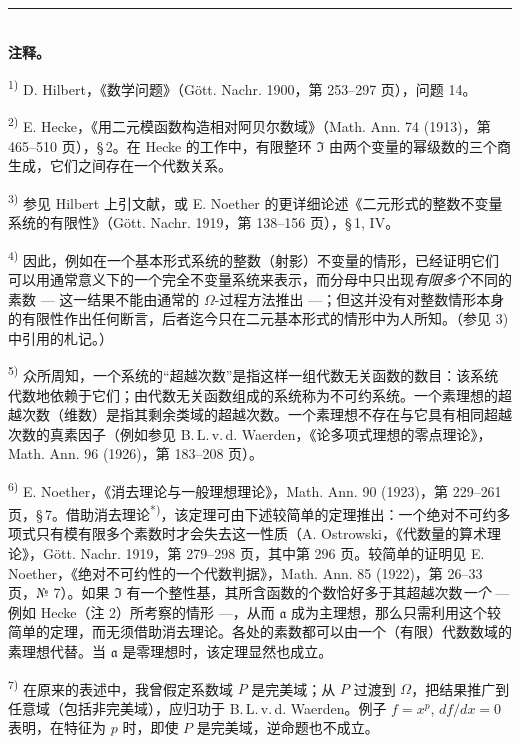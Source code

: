 \documentclass[11pt]{article}
\begin{document}
\begin{center}
\rule{4cm}{0.4pt}\\[0.6em]
\textbf{注释。}
\end{center}

{\small
\setlength{\parindent}{0pt}
\noindent\textsuperscript{1)} D. Hilbert，《数学问题》（Gött. Nachr. 1900，第 253--297 页），问题 14。

\noindent\textsuperscript{2)} E. Hecke，《用二元模函数构造相对阿贝尔数域》（Math. Ann. 74 (1913)，第 465--510 页），\S\,2。在 Hecke 的工作中，有限整环 $\mathfrak{I}$ 由两个变量的幂级数的三个商生成，它们之间存在一个代数关系。

\noindent\textsuperscript{3)} 参见 Hilbert 上引文献，或 E. Noether 的更详细论述《二元形式的整数不变量系统的有限性》（Gött. Nachr. 1919，第 138--156 页），\S\,1, IV。

\noindent\textsuperscript{4)} 因此，例如在一个基本形式系统的整数（射影）不变量的情形，已经证明它们可以用通常意义下的一个完全不变量系统来表示，而分母中只出现\emph{有限多个}不同的素数 --- 这一结果不能由通常的 $\Omega$-过程方法推出 ---；但这并没有对整数情形本身的有限性作出任何断言，后者迄今只在二元基本形式的情形中为人所知。（参见 3) 中引用的札记。）

\noindent\textsuperscript{5)} 众所周知，一个系统的“超越次数”是指这样一组代数无关函数的数目：该系统代数地依赖于它们；由代数无关函数组成的系统称为不可约系统。一个素理想的超越次数（维数）是指其剩余类域的超越次数。一个素理想不存在与它具有相同超越次数的真素因子（例如参见 B.\,L.\,v.\,d. Waerden，《论多项式理想的零点理论》，Math. Ann. 96 (1926)，第 183--208 页）。

\noindent\textsuperscript{6)} E. Noether，《消去理论与一般理想理论》，Math. Ann. 90 (1923)，第 229--261 页，\S\,7。借助消去理论\textsuperscript{*)}，该定理可由下述较简单的定理推出：一个绝对不可约多项式只有模有限多个素数时才会失去这一性质（A. Ostrowski，《代数量的算术理论》，Gött. Nachr. 1919，第 279--298 页，其中第 296 页。较简单的证明见 E. Noether，《绝对不可约性的一个代数判据》，Math. Ann. 85 (1922)，第 26--33 页，№ 7）。如果 $\mathfrak{I}$ 有一个整性基，其所含函数的个数恰好多于其超越次数\emph{一个} --- 例如 Hecke（注 2）所考察的情形 ---，从而 $\mathfrak{a}$ 成为主理想，那么只需利用这个较简单的定理，而无须借助消去理论。各处的素数都可以由一个（有限）代数数域的素理想代替。当 $\mathfrak{a}$ 是零理想时，该定理显然也成立。

\noindent\textsuperscript{7)} 在原来的表述中，我曾假定系数域 $P$ 是完美域；从 $P$ 过渡到 $\Omega$，把结果推广到任意域（包括非完美域），应归功于 B.\,L.\,v.\,d. Waerden。例子 $f=x^p$, $df/dx=0$ 表明，在特征为 $p$ 时，即使 $P$ 是完美域，逆命题也不成立。

}
\end{document}
